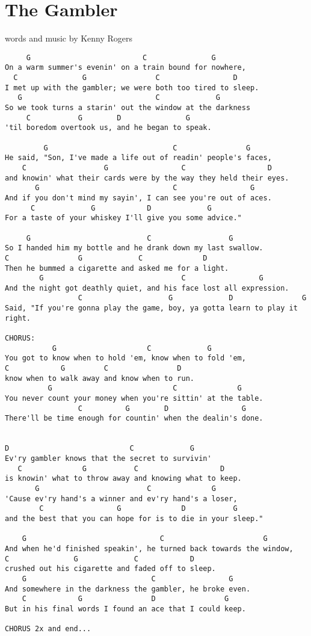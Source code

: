 \section{The Gambler} \label{sec:song2}
words and music by Kenny Rogers
\begin{verbatim}
     G                          C               G
On a warm summer's evenin' on a train bound for nowhere,
  C               G                C                 D
I met up with the gambler; we were both too tired to sleep.
   G                               C             G
So we took turns a starin' out the window at the darkness
     C           G        D               G
'til boredom overtook us, and he began to speak.

         G                             C                G
He said, "Son, I've made a life out of readin' people's faces,
    C                  G                 C                   D
and knowin' what their cards were by the way they held their eyes.
       G                               C                 G
And if you don't mind my sayin', I can see you're out of aces.
      C             G            D             G
For a taste of your whiskey I'll give you some advice."

     G                           C                  G
So I handed him my bottle and he drank down my last swallow. 
C                G             C              D
Then he bummed a cigarette and asked me for a light.
        G                                C                 G
And the night got deathly quiet, and his face lost all expression.
                 C                    G             D                G
Said, "If you're gonna play the game, boy, ya gotta learn to play it right.

CHORUS:
           G                     C             G
You got to know when to hold 'em, know when to fold 'em,
C            G         C                D
know when to walk away and know when to run.
          G                            C              G
You never count your money when you're sittin' at the table.
                 C          G        D                 G
There'll be time enough for countin' when the dealin's done.


D                            C             G
Ev'ry gambler knows that the secret to survivin'
   C              G           C                   D
is knowin' what to throw away and knowing what to keep.
       G                         C              G
'Cause ev'ry hand's a winner and ev'ry hand's a loser,
        C                 G              D           G
and the best that you can hope for is to die in your sleep."

    G                               C                       G
And when he'd finished speakin', he turned back towards the window,
C               G             C            D
crushed out his cigarette and faded off to sleep.
    G                             C                 G
And somewhere in the darkness the gambler, he broke even.
    C            G                D                G
But in his final words I found an ace that I could keep.

CHORUS 2x and end...
\end{verbatim}

